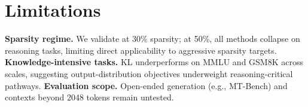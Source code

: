 \clearpage
\section*{Limitations}

\textbf{Sparsity regime.} We validate at 30\% sparsity; at 50\%, all methods collapse on reasoning tasks, limiting direct applicability to aggressive sparsity targets.
\textbf{Knowledge-intensive tasks.} KL underperforms on MMLU and GSM8K across scales, suggesting output-distribution objectives underweight reasoning-critical pathways.
\textbf{Evaluation scope.} Open-ended generation (e.g., MT-Bench) and contexts beyond 2048 tokens remain untested.

